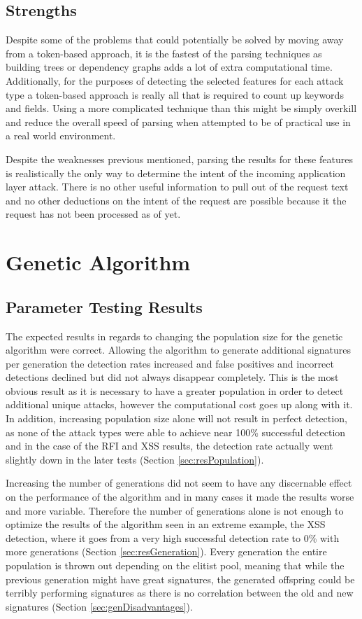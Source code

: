 \subsection{Strengths}

Despite some of the problems that could potentially be solved by moving away from a token-based approach, it is the fastest of the parsing techniques as building trees or dependency graphs adds a lot of extra computational time.  Additionally, for the purposes of detecting the selected features for each attack type a token-based approach is really all that is required to count up keywords and fields.  Using a more complicated technique than this might be simply overkill and reduce the overall speed of parsing when attempted to be of practical use in a real world environment.

Despite the weaknesses previous mentioned, parsing the results for these features is realistically the only way to determine the intent of the incoming application layer attack. There is no other useful information to pull out of the request text and no other deductions on the intent of the request are possible because it the request has not been processed as of yet.

\section{Genetic Algorithm}
\subsection{Parameter Testing Results}

The expected results in regards to changing the population size for the genetic algorithm were correct.  Allowing the algorithm to generate additional signatures per generation the detection rates increased and false positives and incorrect detections declined but did not always disappear completely.  This is the most obvious result as it is necessary to have a greater population in order to detect additional unique attacks, however the computational cost goes up along with it.  In addition, increasing population size alone will not result in perfect detection, as none of the attack types were able to achieve near 100\% successful detection and in the case of the RFI and XSS results, the detection rate actually went slightly down in the later tests (Section \ref{sec:resPopulation}).

Increasing the number of generations did not seem to have any discernable effect on the performance of the algorithm and in many cases it made the results worse and more variable.  Therefore the number of generations alone is not enough to optimize the results of the algorithm seen in an extreme example, the XSS detection, where it goes from a very high successful detection rate to 0\% with more generations (Section \ref{sec:resGeneration}).  Every generation the entire population is thrown out depending on the elitist pool, meaning that while the previous generation might have great signatures, the generated offspring could be terribly performing signatures as there is no correlation between the old and new signatures (Section \ref{sec:genDisadvantages}).

